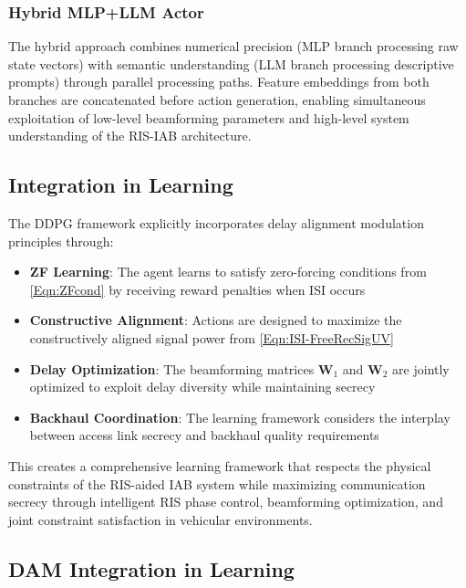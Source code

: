 \subsubsection{Hybrid MLP+LLM Actor}
The hybrid approach combines numerical precision (MLP branch processing raw state vectors) with semantic understanding (LLM branch processing descriptive prompts) through parallel processing paths. Feature embeddings from both branches are concatenated before action generation, enabling simultaneous exploitation of low-level beamforming parameters and high-level system understanding of the RIS-IAB architecture.

\subsection{Integration in Learning}

The DDPG framework explicitly incorporates delay alignment modulation principles through:
\begin{itemize}
\item \textbf{ZF Learning}: The agent learns to satisfy zero-forcing conditions from \eqref{Eqn:ZFcond} by receiving reward penalties when ISI occurs
\item \textbf{Constructive Alignment}: Actions are designed to maximize the constructively aligned signal power from \eqref{Eqn:ISI-FreeRecSigUV}
\item \textbf{Delay Optimization}: The beamforming matrices $\mathbf{W}_1$ and $\mathbf{W}_2$ are jointly optimized to exploit delay diversity while maintaining secrecy
\item \textbf{Backhaul Coordination}: The learning framework considers the interplay between access link secrecy and backhaul quality requirements
\end{itemize}

This creates a comprehensive learning framework that respects the physical constraints of the RIS-aided IAB system while maximizing communication secrecy through intelligent RIS phase control, beamforming optimization, and joint constraint satisfaction in vehicular environments.

\subsection{DAM Integration in Learning}

